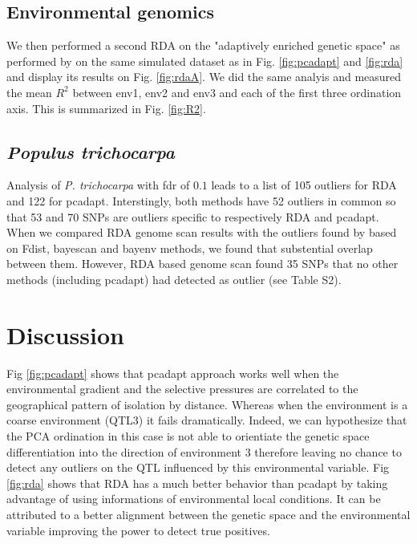 \documentclass[nogrid]{MBE}%
\begin{document}
\subsection{Environmental genomics}

We then performed a second RDA on the "adaptively enriched genetic space" as performed by \citet{Steane2014a} on the same simulated dataset as in Fig. \ref{fig:pcadapt} and \ref{fig:rda} and display its results on Fig. \ref{fig:rdaA}. We did the same analyis and measured the mean $R^2$ between env1, env2 and env3 and each of the first three ordination axis. This is summarized in Fig. \ref{fig:R2}.



\subsection{\textit{Populus trichocarpa}}

Analysis of \textit{P. trichocarpa} with fdr of $0.1$ leads to a list of 105 outliers for RDA and 122 for pcadapt. Interstingly, both methods have 52 outliers in common so that 53 and 70 SNPs are outliers specific to respectively RDA and pcadapt. When we compared RDA genome scan results with the outliers found by \citet{Geraldes2014} based on Fdist, bayescan and bayenv methods, we found that substential overlap between them. However, RDA based genome scan found 35 SNPs that no other methods (including pcadapt) had detected as outlier (see Table S2).


\section{Discussion}

Fig \ref{fig:pcadapt} shows that pcadapt approach works well when the environmental gradient and the selective pressures are correlated to the  geographical pattern of isolation by distance. Whereas when the environment is a coarse environment (QTL3) it fails dramatically. Indeed, we can hypothesize that the PCA ordination in this case is not able to orientiate the genetic space differentiation into the direction of environment 3 therefore leaving no chance to detect any outliers on the QTL influenced by this environmental variable. Fig \ref{fig:rda} shows that RDA has a much better behavior than pcadapt by taking advantage of using informations of environmental local conditions. It can be attributed to a better alignment between the genetic space and the environmental variable improving the power to detect true positives.
\end{document}
